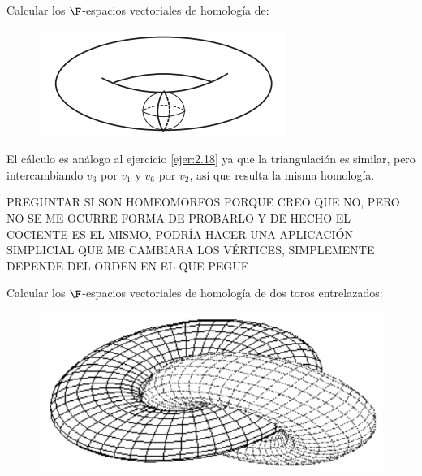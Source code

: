 \documentclass[twoside]{article}
\begin{document}
\begin{ejercicio}{2.20}
Calcular los $\F$-espacios vectoriales de homología de:

\begin{figure}[h!]
\centering
\includegraphics[scale=0.7]{toro1}
\end{figure}
\end{ejercicio}
\begin{solucion}
El cálculo es análogo al ejercicio \ref{ejer:2.18} ya que la triangulación es similar, pero intercambiando $v_3$ por $v_1$ y $v_6$ por $v_2$, así que resulta la misma homología. 

PREGUNTAR SI SON HOMEOMORFOS PORQUE CREO QUE NO, PERO NO SE ME OCURRE FORMA DE PROBARLO Y DE HECHO EL COCIENTE ES EL MISMO, PODRÍA HACER UNA APLICACIÓN SIMPLICIAL QUE ME CAMBIARA LOS VÉRTICES, SIMPLEMENTE DEPENDE DEL ORDEN EN EL QUE PEGUE
\end{solucion}

\newpage

\begin{ejercicio}{2.21}
Calcular los $\F$-espacios vectoriales de homología de dos toros entrelazados:

\begin{figure}[h!]
\centering
\includegraphics[scale=0.5]{toro2}
\end{figure}
\end{ejercicio}
\end{document}
